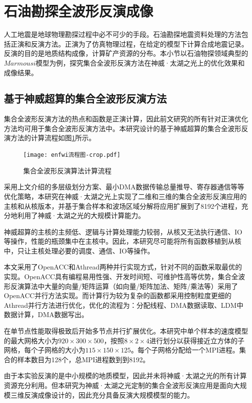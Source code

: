 \section{石油勘探全波形反演成像} %

人工地震是地球物理勘探过程中必不可少的手段。石油勘探地震资料处理的方法包括正演和反演方法。正演为了仿真物理过程，在给定的模型下计算合成地震记录。反演的目的是地质结构成像，计算矿产资源的分布。本小节以石油物探领域典型的$Marmousi$模型为例，探究集合全波形反演方法在神威·太湖之光上的优化效果和成像结果。

\subsection{基于神威超算的集合全波形反演方法}

集合全波形反演方法的热点和函数是正演计算，因此前文研究的所有针对正演优化方法均可用于集合全波形反演方法中。本研究设计的基于神威超算的集合全波形反演方法的计算流程如图\ref{fig:enfwi-flow}所示。

\begin{figure}[ht]
\centering
\texttt{[image: enfwi流程图-crop.pdf]}
\caption{集合全波形反演算法计算流程}
\label{fig:enfwi-flow}
\end{figure}

采用上文介绍的多层级划分方案、最小DMA数据传输总量推导、寄存器通信等等优化策略，本研究在神威·太湖之光上实现了二维和三维的集合全波形反演应用的主核和从核版本，并基于集合样本和波场区域分解将应用扩展到了8192个进程，充分地利用了神威·太湖之光的大规模计算能力。

神威超算的主核的主频低、逻辑与计算处理能力较弱，从核又无法执行通信、IO等操作，性能的瓶颈集中在主核中。因此，本研究尽可能将所有函数移植到从核中，只让主核处理必要的调度、通信、IO等操作。

本文采用了OpenACC和Athread两种并行实现方式，针对不同的函数采取最优的实现。OpenACC具有编程易用性强、开发时间短、可维护性高等优势，集合全波形反演算法中大量的向量/矩阵运算（如向量/矩阵加法、矩阵/乘法等）采用了OpenACC并行方法实现。而计算行为较为复杂的函数都采用控制粒度更细的Athread并行方法进行优化，优化的流程为：分配线程、DMA数据读取、LDM中数据计算，DMA数据写出。

在单节点性能取得极致后开始多节点并行扩展优化。本研究中单个样本的速度模型的最大网格大小为$920\times 300 \times 500$，按照$8\times 2 \times 4$进行划分以获得接近立方体的子网格，每个子网格的大小为$115\times150\times125$。每个子网格分配给一个MPI进程。集合的样本数目为128个，总MPI进程数到到8192。

由于本实验反演的是中小规模的地质模型，因此并未将神威·太湖之光的所有计算资源充分利用。但本研究为神威·太湖之光定制的集合全波形反演应用是面向大规模三维反演成像设计的，因此充分具备反演大规模模型的能力。

